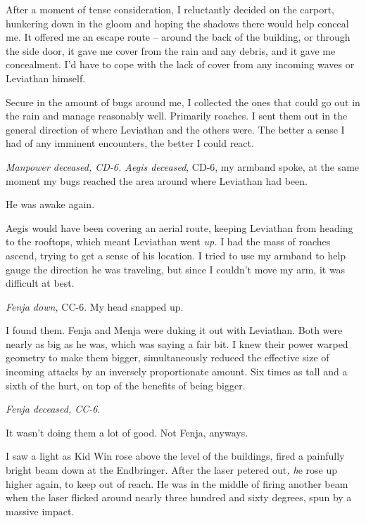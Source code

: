 After a moment of tense consideration, I reluctantly decided on the carport, hunkering down in the gloom and hoping the shadows there would help conceal me.  It offered me an escape route – around the back of the building, or through the side door, it gave me cover from the rain and any debris, and it gave me concealment.  I'd have to cope with the lack of cover from any incoming waves or Leviathan himself.



Secure in the amount of bugs around me, I collected the ones that could go out in the rain and manage reasonably well.  Primarily roaches.  I sent them out in the general direction of where Leviathan and the others were.  The better a sense I had of any imminent encounters, the better I could react.



\emph{Manpower deceased, CD-6.  Aegis deceased}, CD-6, my armband spoke, at the same moment my bugs reached the area around where Leviathan had been.



He was awake again.



Aegis would have been covering an aerial route, keeping Leviathan from heading to the rooftops, which meant Leviathan went \emph{up.}  I had the mass of roaches ascend, trying to get a sense of his location.  I tried to use my armband to help gauge the direction he was traveling, but since I couldn't move my arm, it was difficult at best.



\emph{Fenja down,} CC-6.  My head snapped up.



I found them.  Fenja and Menja were duking it out with Leviathan.  Both were nearly as big as he was, which was saying a fair bit.  I knew their power warped geometry to make them bigger, simultaneously reduced the effective size of incoming attacks by an inversely proportionate amount.  Six times as tall and a sixth of the hurt, on top of the benefits of being bigger.



\emph{Fenja deceased, CC-6}.



It wasn't doing them a lot of good.  Not Fenja, anyways.



I saw a light as Kid Win rose above the level of the buildings, fired a painfully bright beam down at the Endbringer\emph{.  }After the laser petered out\emph{, h}e rose up higher again, to keep out of reach.  He was in the middle of firing another beam when the laser flicked around nearly three hundred and sixty degrees, spun by a massive impact.



